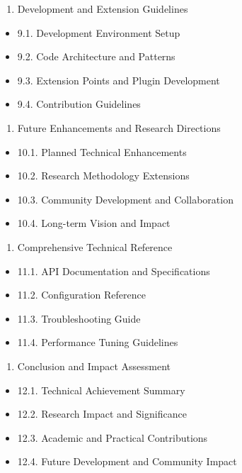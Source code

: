 \documentclass[12pt,a4paper]{article}
\begin{document}
\begin{enumerate}
\item Development and Extension Guidelines
\end{enumerate}
\begin{itemize}
\item 9.1. Development Environment Setup
\item 9.2. Code Architecture and Patterns
\item 9.3. Extension Points and Plugin Development
\item 9.4. Contribution Guidelines

\end{itemize}
\begin{enumerate}
\item Future Enhancements and Research Directions
\end{enumerate}
\begin{itemize}
\item 10.1. Planned Technical Enhancements
\item 10.2. Research Methodology Extensions
\item 10.3. Community Development and Collaboration
\item 10.4. Long-term Vision and Impact

\end{itemize}
\begin{enumerate}
\item Comprehensive Technical Reference
\end{enumerate}
\begin{itemize}
\item 11.1. API Documentation and Specifications
\item 11.2. Configuration Reference
\item 11.3. Troubleshooting Guide
\item 11.4. Performance Tuning Guidelines

\end{itemize}
\begin{enumerate}
\item Conclusion and Impact Assessment
\end{enumerate}
\begin{itemize}
\item 12.1. Technical Achievement Summary
\item 12.2. Research Impact and Significance
\item 12.3. Academic and Practical Contributions
\item 12.4. Future Development and Community Impact

\end{itemize}
\end{document}
